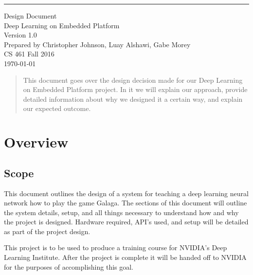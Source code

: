 \documentclass{scrreprt}
\date{}
\newcommand\blankpage{
    \null
    \thispagestyle{empty}
    \addtocounter{page}{-1}
    \newpage}
\def\myversion{1.0 }
\begin{document}
\begin{titlingpage}
	\begin{flushright}
		\rule{16cm}{5pt}\vskip1cm
		\begin{bfseries}
			\Huge{Design Document}\\
			\vspace{1.0cm}
			Deep Learning on Embedded Platform\\
			\vspace{1.0cm}
			\LARGE{Version \myversion}\\
			\vspace{1.0cm}
			Prepared by Christopher Johnson, Luay Alshawi, Gabe Morey\\
			\vspace{1.0cm}
			CS 461 Fall 2016\\
			\vspace{1.0cm}
			\today\\
		\end{bfseries}
	\end{flushright}
	\begin{abstract}
	This document goes over the design decision made for our Deep Learning on Embedded Platform project.
	In it we will explain our approach, provide detailed information about why we designed it a certain way, and explain our expected outcome.
	\end{abstract}
\end{titlingpage}
\afterpage{\blankpage}

\tableofcontents

\chapter{Overview}
\section{Scope}

This document outlines the design of a system for teaching a deep learning neural network how to play the game Galaga.
The sections of this document will outline the system details, setup, and all things necessary to understand how and why the project is designed.
Hardware required, API's used, and setup will be detailed as part of the project design.

This project is to be used to produce a training course for NVIDIA's Deep Learning Institute.
After the project is complete it will be handed off to NVIDIA for the purposes of accomplishing this goal.
\end{document}
